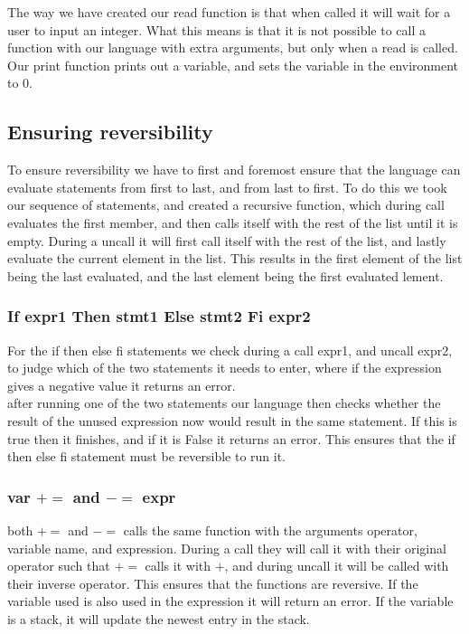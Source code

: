 \documentclass[10pt,a4paper]{article}      %
\begin{document}
The way we have created our read function is that when called it will wait for a user to input an integer. What this means is that it is not possible to call a function with our language with extra arguments, but only when a read is called.
\\
Our print function prints out a variable, and sets the variable in the environment to 0.

\subsection*{Ensuring reversibility}

To ensure reversibility we have to first and foremost ensure that the language can evaluate statements from first to last, and from last to first. To do this we took our sequence of statements, and created a recursive function, which during call evaluates the first member, and then calls itself with the rest of the list until it is empty. During a uncall it will first call itself with the rest of the list, and lastly evaluate the current element in the list. This results in the first element of the list being the last evaluated, and the last element being the first evaluated lement.

\subsubsection*{If expr1 Then stmt1 Else stmt2 Fi expr2}

For the if then else fi statements we check during a call expr1, and uncall expr2, to judge which of the two statements it needs to enter, where if the expression gives a negative value it returns an error.
\\
after running one of the two statements our language then checks whether the result of the unused expression now would result in the same statement. If this is true then it finishes, and if it is False it returns an error. This ensures that the if then else fi statement must be reversible to run it.

\subsubsection*{var $+=$ and $-=$ expr}

both $+=$ and $-=$ calls the same function with the arguments operator, variable name, and expression. During a call they will call it with their original operator such that $+=$ calls it with $+$, and during uncall it will be called with their inverse operator. This ensures that the functions are reversive. If the variable used is also used in the expression it will return an error. If the variable is a stack, it will update the newest entry in the stack.
\end{document}
